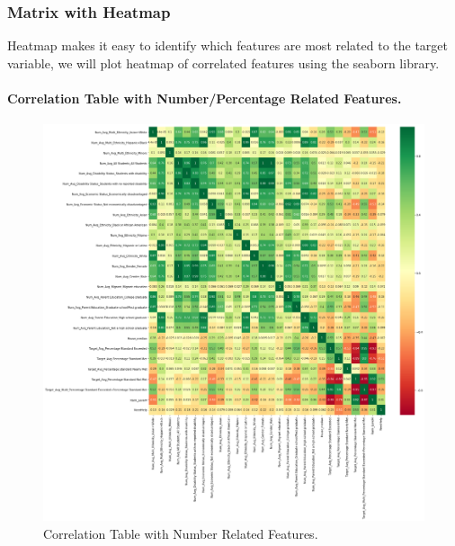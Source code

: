 \documentclass[11pt]{article}
\begin{document}
\subsubsection{Matrix with Heatmap}

Heatmap makes it easy to identify which features are most related to the target variable, we will plot heatmap of correlated features using the seaborn library.

\paragraph*{Correlation Table with Number/Percentage Related Features.}

\begin{figure}[h!]
\centering 
\includegraphics[width=\textwidth]{output_83_0.png}
\caption{Correlation Table with Number Related Features.}
  \label{fig:corr_num}
\end{figure}
\end{document}
